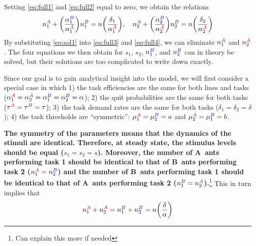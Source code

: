 \documentclass[10pt]{article}
\theoremstyle{remark}
\newcommand{\A}{{\color{red}A}}
\newcommand{\B}{{\color{blue}B}}
\begin{document}
Setting \eqref{eq:full1} and \eqref{eq:full2} equal to zero, we obtain the relations
\begin{equation}
    n_{1}^{\A} + \bigg( \frac{\alpha_1^{\B}}{\alpha_1^{\A}} \bigg) n_{1}^{\B} 
    = n\bigg(\frac{\delta_1}{\alpha_1^{\A}} \bigg),
    \quad     
    n_{2}^{\A} + \bigg( \frac{\alpha_2^{\B}}{\alpha_2^{\A}} \bigg) n_{2}^{\B} 
    = n\bigg(\frac{\delta_2}{\alpha_2^{\A}}\bigg)
    \label{eq:sol1}
\end{equation}
By substituting \eqref{eq:sol1} into \eqref{eq:full3} and \eqref{eq:full4}, we can eliminate $n_{1}^{\A}$ and $n_{2}^{\A}$. The four equations we then obtain for $s_1$, $s_2$, $n_{1}^{\B}$, and $n_{2}^{\B}$ can in theory be solved, but their solutions are too complicated to write down exactly. 

Since our goal is to gain analytical insight into the model, we will first consider a special case in which 1) the task efficiencies are the same for both lines and tasks ($\alpha_{1}^{\A} = \alpha_{2}^{\A} = \alpha_{1}^{\B} = \alpha_{2}^{\B} = \alpha$); 2) the quit probabilities are the same for both tasks ($\tau^{\A} = \tau^{\B} = \tau$); 3) the task demand rates are the same for both tasks ($\delta_1 = \delta_2  = \delta$); 4) the task thresholds are ``symmetric'': $\mu_{1}^{\A} = \mu_{2}^{\B} = a$ and $\mu_{2}^{\A} = \mu_{1}^{\B} = b$. 

\textbf{The symmetry of the parameters means that the dynamics of the stimuli are identical. Therefore, at steady state, the stimulus levels should be equal ($s_1 = s_2 = s$). Moreover, the number of \A\ ants performing task 1 should be identical to that of \B\ ants performing task 2 ($n_{1}^{\A} = n_{2}^{\B}$) and the number of \B\ ants performing task 1 should be identical to that of \A\ ants performing task 2 ($n_{1}^{\B} = n_{2}^{\A}$).}\footnote{Can explain this more if needed} This in turn implies that
\begin{equation}
    n_{1}^{\A} +  n_{2}^{\A} 
    = n_{1}^{\B} +  n_{2}^{\B} 
    = n\bigg(\frac{\delta}{\alpha} \bigg)
    \label{eq:sol3}
\end{equation}
\end{document}
